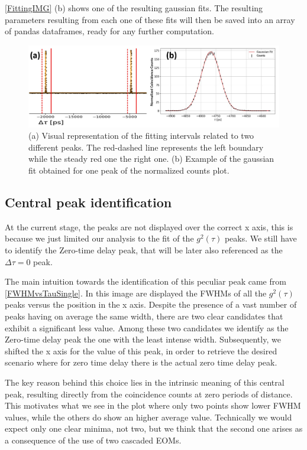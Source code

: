 \autoref{FittingIMG} (b) shows one of the resulting gaussian fits.
The resulting parameters resulting from each one of these fits will then be saved into an array of pandas dataframes, ready for any further computation.
\begin{figure}[hbtp]
\centering
\includegraphics[width=1\textwidth]{NCountsFitting.jpg}
\caption{(a) Visual representation of the fitting intervals related to two different peaks. The red-dashed line represents the left boundary while the steady red one the right one. (b) Example of the gaussian fit obtained for one peak of the normalized counts plot.}
\label{FittingIMG}
\end{figure}

\subsection{Central peak identification}
\label{subsec:CentralPeakId}
At the current stage, the peaks are not displayed over the correct x axis, this is because we just limited our analysis to the fit of the $g^2 (\tau)$ peaks. We still have to identify the Zero-time delay peak, that will be later also referenced as the  $\Delta \tau = 0$ peak.

The main intuition towards the identification of this peculiar peak came from \autoref{FWHMvsTauSingle}.
In this image are displayed the FWHMs of all the $g^2 (\tau)$ peaks versus the position in the x axis.
Despite the presence of a vast number of peaks having on average the same width, there are two clear candidates that exhibit a significant less value.
Among these two candidates we identify as the Zero-time delay peak the one with the least intense width.
Subsequently, we shifted the x axis for the value of this peak, in order to retrieve the desired scenario where for zero time delay there is the actual zero time delay peak.

The key reason behind this choice lies in the intrinsic meaning of this central peak, resulting directly from the coincidence counts at zero periods of distance. This motivates what we see in the plot where only two points show lower FWHM values, while the others do show an higher average value.
Technically we would expect only one clear minima, not two, but we think that the second one arises as a consequence of the use of two cascaded EOMs.


